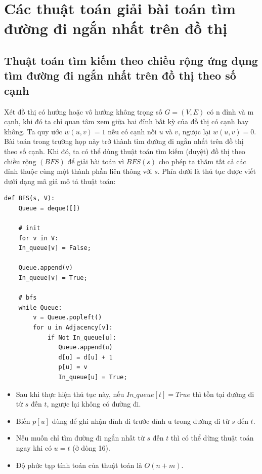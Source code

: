 \documentclass[a4paper,12pt]{report}
\begin{document}

\section{Các thuật toán giải bài toán tìm đường đi ngắn nhất trên đồ thị}
\subsection{Thuật toán tìm kiếm theo chiều rộng ứng dụng tìm đường đi ngắn nhất trên đồ thị theo số cạnh}
Xét đồ thị có hướng hoặc vô hướng không trọng số $ G = (V, E) $ có n đỉnh và m cạnh, khi đó ta chỉ quan tâm xem giữa hai đỉnh bất kỳ của đồ thị có cạnh hay không. Ta quy ước $w(u, v) = 1 $ nếu có cạnh nối $u$ và $v$, ngược lại $ w(u, v) = 0 $. Bài toán trong trường họp này trở thành tìm đường đi ngắn nhất trên đồ thị theo số cạnh. Khi đó, ta có thể dùng thuật toán tìm kiếm (duyệt) đồ thị theo chiều rộng $ (BFS) $ để giải bài toán vì $ BFS(s) $ cho phép ta thăm tất cả các đỉnh thuộc cùng một thành phần liên thông với $s$. Phía dưới là thủ tục được viết dưới dạng mã giả mô tả thuật toán:\\

\begin{verbatim}
def BFS(s, V):
    Queue = deque([])

    # init
    for v in V:
    In_queue[v] = False;

    Queue.append(v)
    In_queue[v] = True;			

    # bfs
    while Queue:
        v = Queue.popleft()
        for u in Adjacency[v]:
            if Not In_queue[u]:
               Queue.append(u)
               d[u] = d[u] + 1
               p[u] = v
               In_queue[u] = True;
\end{verbatim}
	
	
	\begin{itemize}
		\item Sau khi thực hiện thủ tục này, nếu $ In\_queue[t] = True $ thì tồn tại đường đi từ $s$ đến $t$, ngược lại không có đường đi.
		\item Biến $ p[u] $ dùng để ghi nhận đỉnh đi trước đỉnh u trong đường đi từ $s$ đến $t$.
                \item Nếu muốn chỉ tìm đường đi ngắn nhất từ $s$ đến $t$ thì có
                    thể dừng thuật toán ngay khi có $u = t$ (ở dòng 16).
		\item Độ phức tạp tính toán của thuật toán là $ O(n+m) $.

	\end{itemize}
\end{document}
